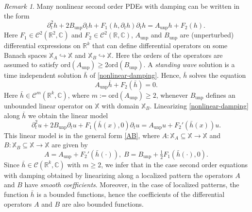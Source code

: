 \documentclass[11pt]{amsart}
\numberwithin{equation}{section}
\newcommand\R{\mathbb R}
\newcommand{\RR}{{\mathbb R}}
\newcommand{\CC}{{\mathbb C}}
\theoremstyle{remark}
\newtheorem{remark}[theorem]{Remark}
\theoremstyle{definition}
\newcommand\cC{{\mathcal C}}
\newcommand\bX{{\mathbb X}}
\begin{document}
\begin{remark}\label{r8.10}
	Many nonlinear second order PDEs with damping can be written in the form
	\begin{equation}\label{nonlinear-damping}	
		\partial_t^2h+2B_{\mathrm{unp}}\partial_th+F_1(h,\partial_th)\partial_th=A_{\mathrm{unp}} h+F_2(h).	
	\end{equation}	
	Here $F_1\in\cC^2(\RR^2,\CC)$ and $F_2\in\cC^2(\RR,\CC)$, $A_{\mathrm{unp}}$ and $B_{\mathrm{unp}}$ are (unperturbed) differential expressions on $\RR^k$ that can define differential operators on some Banach spaces $\bX_A\hookrightarrow\bX$ and $\bX_B\hookrightarrow\bX$. Here the orders of the operators are assumed to satisfy $\mathrm{ord}(A_{\mathrm{unp}})\geq 2\mathrm{ord}(B_{\mathrm{unp}})$. A \emph{standing wave} solution is a time independent solution $\bar h$ of \eqref{nonlinear-damping}. Hence, $\bar h$ solves the equation 
	\begin{equation}\label{standing-wave}	
		A_{\mathrm{unp}} \bar h+F_2(\bar h)=0.	
	\end{equation}	
	Here $\bar h\in\cC^m(\RR^k,\CC)$, where $m:=\mathrm{ord}(A_{\mathrm{unp}})\geq2$, whenever $B_{\mathrm{unp}}$ defines an unbounded linear operator on $\bX$ with domain $\bX_B$. Linearizing \eqref{nonlinear-damping} along $\bar h$ we obtain the linear model
	\begin{equation}\label{linearized-damping}	
		\partial_t^2u+2B_{\mathrm{unp}}\partial_tu+F_1(\bar h(x),0)\partial_tu=A_{\mathrm{unp}} u+F_2'(\bar h(x))u.	
	\end{equation}	
	This linear model is in the general form \eqref{AB}, where $A:\bX_A\subseteq\bX\to\bX$	and $B:\bX_B\subseteq\bX\to\bX$	are given by
	\begin{equation}\label{linearized-AB}
		A=A_{\mathrm{unp}}+F_2'(\bar h(\cdot)),\;B=B_{\mathrm{unp}}+\tfrac{1}{2}F_1(\bar h(\cdot),0).	
	\end{equation}	
	Since $\bar h\in\cC(\R^k,\CC)$ with $m\geq 2$, we infer that in the case second order equations with damping obtained by linearizing along a localized pattern the operators $A$ and $B$ have \emph{smooth coefficients}. Moreover, in the case of localized patterns, the function $\bar h$ is a bounded functions, hence the coefficients of the differential operators $A$ and $B$ are also bounded functions.
\end{remark}		
	
\appendix
\end{document}
